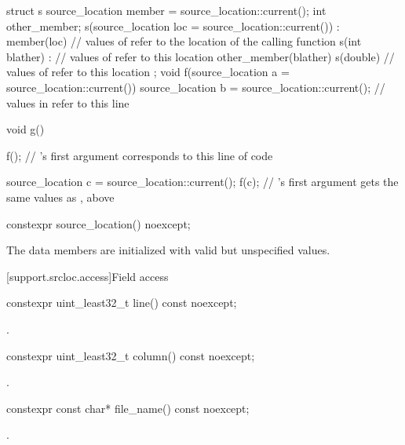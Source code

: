 \pnum
\begin{example}
\begin{codeblock}
struct s {
  source_location member = source_location::current();
  int other_member;
  s(source_location loc = source_location::current())
    : member(loc)               // values of  refer to the location of the calling function
  {}
  s(int blather) :              // values of  refer to this location
    other_member(blather)
  {}
  s(double)                     // values of  refer to this location
  {}
};
void f(source_location a = source_location::current()) {
  source_location b = source_location::current();       // values in  refer to this line
}

void g() {
  f();                          // 's first argument corresponds to this line of code

  source_location c = source_location::current();
  f(c);                         // 's first argument gets the same values as , above
}
\end{codeblock}
\end{example}

\begin{itemdecl}
constexpr source_location() noexcept;
\end{itemdecl}
\begin{itemdescr}

\pnum
{}
The data members are initialized with valid but unspecified values.
\end{itemdescr}

[support.srcloc.access]{Field access}

\begin{itemdecl}
constexpr uint_least32_t line() const noexcept;
\end{itemdecl}
\begin{itemdescr}
\pnum
\returns {}.
\end{itemdescr}

\begin{itemdecl}
constexpr uint_least32_t column() const noexcept;
\end{itemdecl}
\begin{itemdescr}
\pnum
\returns
{}.
\end{itemdescr}

\begin{itemdecl}
constexpr const char* file_name() const noexcept;
\end{itemdecl}
\begin{itemdescr}
\pnum
\returns
{}.
\end{itemdescr}

